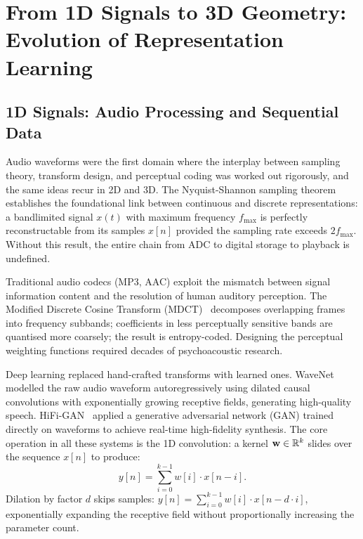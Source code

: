 \section{From 1D Signals to 3D Geometry: Evolution of Representation Learning}
\label{sec:signal-progression}

\subsection{1D Signals: Audio Processing and Sequential Data}

Audio waveforms were the first domain where the interplay between
sampling theory, transform design, and perceptual coding was worked out
rigorously, and the same ideas recur in 2D and 3D.
The Nyquist-Shannon sampling theorem~\cite{shannon1949noise} establishes
the foundational link between continuous and discrete representations:
a bandlimited signal $x(t)$ with maximum frequency $f_{\max}$ is perfectly
reconstructable from its samples $x[n]$ provided the sampling rate exceeds
$2f_{\max}$.
Without this result, the entire chain from ADC to digital storage to playback
is undefined.

Traditional audio codecs (MP3, AAC) exploit the mismatch between signal
information content and the resolution of human auditory perception.
The Modified Discrete Cosine Transform (MDCT)~\cite{princen1987mdct} decomposes overlapping frames
into frequency subbands; coefficients in less perceptually sensitive bands
are quantised more coarsely; the result is entropy-coded.
Designing the perceptual weighting functions required decades of
psychoacoustic research.

Deep learning replaced hand-crafted transforms with learned ones.
WaveNet~\cite{oord2016wavenet} modelled the raw audio waveform
autoregressively using dilated causal convolutions with exponentially growing
receptive fields, generating high-quality speech.
HiFi-GAN~\cite{kong2020hifigan} applied a generative adversarial network (GAN)
trained directly on waveforms to achieve real-time high-fidelity synthesis.
The core operation in all these systems is the 1D convolution:
a kernel $\mathbf{w} \in \mathbb{R}^k$ slides over the sequence
$x[n]$ to produce:
\begin{equation}
  y[n] = \sum_{i=0}^{k-1} w[i] \cdot x[n - i].
\end{equation}
Dilation by factor $d$ skips samples:
$y[n] = \sum_{i=0}^{k-1} w[i] \cdot x[n - d\cdot i]$,
exponentially expanding the receptive field without proportionally increasing
the parameter count.

